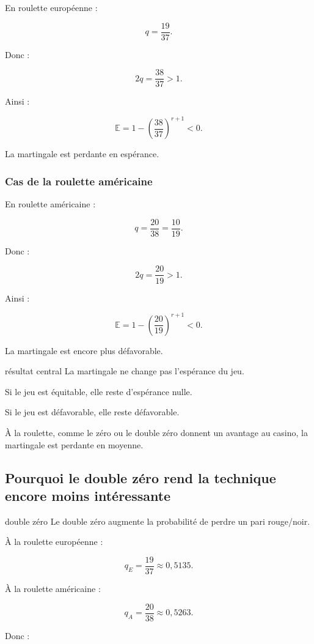 \documentclass[11pt,a4paper]{article}
\begin{document}
En roulette européenne :

\[
q=\frac{19}{37}.
\]

Donc :

\[
2q=\frac{38}{37}>1.
\]

Ainsi :

\[
\mathbb{E}
=
1-\left(\frac{38}{37}\right)^{r+1}<0.
\]

La martingale est perdante en espérance.

\subsubsection*{Cas de la roulette américaine}

En roulette américaine :

\[
q=\frac{20}{38}=\frac{10}{19}.
\]

Donc :

\[
2q=\frac{20}{19}>1.
\]

Ainsi :

\[
\mathbb{E}
=
1-\left(\frac{20}{19}\right)^{r+1}<0.
\]

La martingale est encore plus défavorable.

\begin{conclusionbox}{résultat central}
La martingale ne change pas l'espérance du jeu.

Si le jeu est équitable, elle reste d'espérance nulle.

Si le jeu est défavorable, elle reste défavorable.

À la roulette, comme le zéro ou le double zéro donnent un avantage au casino, la martingale est perdante en moyenne.
\end{conclusionbox}

\subsection{Pourquoi le double zéro rend la technique encore moins intéressante}

\begin{idee}{double zéro}
Le double zéro augmente la probabilité de perdre un pari rouge/noir.
\end{idee}

À la roulette européenne :

\[
q_E=\frac{19}{37}\approx 0{,}5135.
\]

À la roulette américaine :

\[
q_A=\frac{20}{38}\approx 0{,}5263.
\]

Donc :
\end{document}
